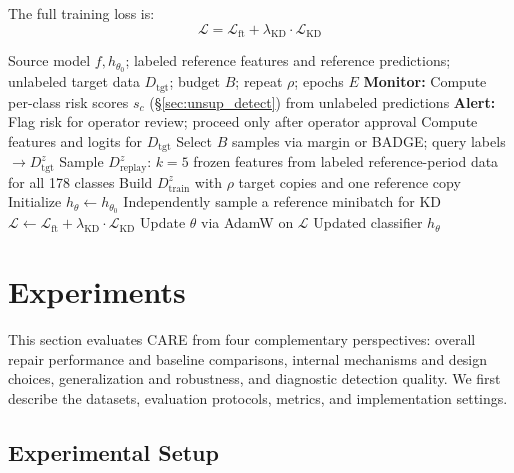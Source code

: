 \documentclass[preprint,12pt,authoryear]{elsarticle}
\newcommand{\ours}{CARE}  %
\begin{document}
The full training loss is:
\begin{equation}
  \mathcal{L} = \mathcal{L}_{\text{ft}} + \lambda_{\text{KD}} \cdot \mathcal{L}_{\text{KD}}
\end{equation}

\begin{algorithm}[t]
\caption{\ours{}: Collapse-Aware Repair}
\label{alg:care}
\begin{algorithmic}[1]
\REQUIRE Source model $f, h_{\theta_0}$; labeled reference features and reference predictions; unlabeled target data $D_{\text{tgt}}$; budget $B$; repeat $\rho$; epochs $E$
\STATE \textbf{Monitor:} Compute per-class risk scores $s_c$ (\S\ref{sec:unsup_detect}) from unlabeled predictions
\STATE \textbf{Alert:} Flag risk for operator review; proceed only after operator approval
\STATE Compute features and logits for $D_{\text{tgt}}$
\STATE Select $B$ samples via margin or BADGE; query labels $\to D_{\text{tgt}}^z$
\STATE Sample $D_{\text{replay}}^z$: $k{=}5$ frozen features from labeled reference-period data for all 178 classes
\STATE Build $D_{\text{train}}^z$ with $\rho$ target copies and one reference copy
\STATE Initialize $h_\theta \leftarrow h_{\theta_0}$
    \STATE Independently sample a reference minibatch for KD
    \STATE $\mathcal{L} \leftarrow \mathcal{L}_{\text{ft}} + \lambda_{\text{KD}} \cdot \mathcal{L}_{\text{KD}}$
    \STATE Update $\theta$ via AdamW on $\mathcal{L}$
  \ENDFOR
\ENDFOR
\RETURN Updated classifier $h_\theta$
\end{algorithmic}
\end{algorithm}


\section{Experiments}
\label{sec:experiments}

This section evaluates \ours{} from four complementary perspectives: overall repair performance and baseline comparisons, internal mechanisms and design choices, generalization and robustness, and diagnostic detection quality. We first describe the datasets, evaluation protocols, metrics, and implementation settings.

\subsection{Experimental Setup}
\label{sec:exp_setup}
\end{document}
